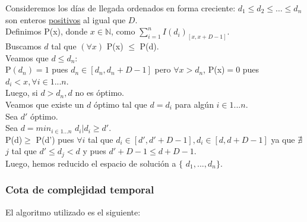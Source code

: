 \documentclass[11pt, a4paper, twoside]{article}
\begin{document}
Consideremos los días de llegada ordenados en forma creciente: $d_1 \le d_2 \le
\dots \le d_n$ son enteros \underline{positivos} al igual que $D$. \\ Definimos
P(x), donde $x \in \mathbb{N}$, como $\sum_{i=1}^{n} I(d_i)_{[x,x+D-1]}$. \\
Buscamos $d$ tal que $(\forall x)$ P(x) $\le$ P(d). \\ Veamos que $d \le d_n$:
\\ P$(d_n)=1$ pues $d_n \in [d_n,d_n + D - 1]$ pero $\forall x > d_n$, P(x)$=0$
pues $d_i < x, \forall i \in 1...n$.\\ Luego, si $d > d_n, d$ no es óptimo. \\
Veamos que existe un $d$ óptimo tal que $d=d_i$ para algún $i \in 1...n$. \\ Sea
$d'$ óptimo. \\ Sea $d=min_{i \in 1...n}$ $d_i \big| d_i \ge d'$. \\ P(d)$\ge$
P(d') pues $\forall i$ tal que $d_i \in [d',d'+D-1], d_i \in [d,d+D-1]$ ya que
$\nexists$ $j$ tal que $d' \le d_j < d$ y pues $d'+D-1 \le d+D-1$. \\ Luego,
hemos reducido el espacio de solución a $\{$ $d_1,...,d_n$$\}$.


\subsubsection{Cota de complejidad temporal}\label{sec:ej1cotatemporal}
El algoritmo utilizado es el siguiente:
\end{document}
